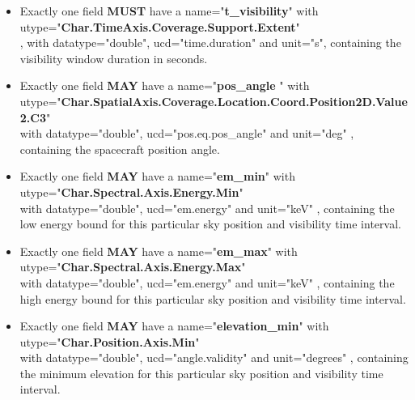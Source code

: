 \documentclass[11pt,a4paper]{ivoa}
\begin{document}
\begin{itemize}
\item Exactly one field \textbf{MUST} have a name="\textbf{t\_visibility}"
with\\ utype="\textbf{Char.TimeAxis.Coverage.Support.Extent}"\\, with
datatype="double", ucd="time.duration" and unit="s", containing the
visibility window duration in seconds.
\end{itemize}


\begin{itemize}
\item Exactly one field \textbf{MAY }have a name="\textbf{pos\_angle
}" with\\
utype="\textbf{Char.SpatialAxis.Coverage.Location.Coord.Position2D.Value2.C3}"\\
with datatype="double", ucd="pos.eq.pos\_angle" and unit="deg" , containing
the spacecraft position angle.
\end{itemize}


\begin{itemize}
\item Exactly one field \textbf{MAY }have a name="\textbf{em\_min}" with\\
utype="\textbf{Char.Spectral.Axis.Energy.Min}"\\
with datatype="double", ucd="em.energy" and unit="keV" , containing the
low energy bound for this particular sky position and visibility time interval.

\item Exactly one field \textbf{MAY }have a name="\textbf{em\_max}" with\\
utype="\textbf{Char.Spectral.Axis.Energy.Max}"\\
with datatype="double", ucd="em.energy" and unit="keV" , containing the
high energy bound for this particular sky position and visibility time interval.
\end{itemize}


\begin{itemize}
\item Exactly one field \textbf{MAY }have a name="\textbf{elevation\_min}" with\\
utype="\textbf{Char.Position.Axis.Min}"\\ with
datatype="double", ucd="angle.validity" and unit="degrees" , containing
the minimum elevation for this particular sky position and visibility
time interval.
\end{itemize}
\end{document}
